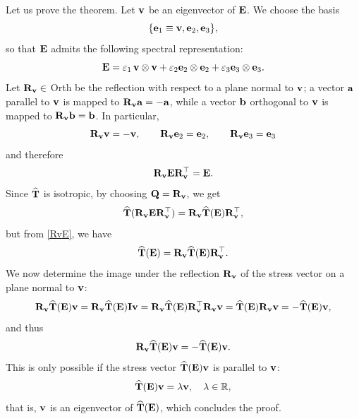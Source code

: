 Let us prove the theorem. Let $\vb$ be an eigenvector of $\Eb$. We choose the basis
\begin{equation}
	\{\eb_1\equiv \vb, \eb_2, \eb_3  \},
\end{equation}
so that $\Eb$ admits the following spectral representation:
\begin{equation}
	\Eb =\varepsilon_1\, \vb \otimes \vb +\varepsilon_2 \eb_2 \otimes \eb_2+ \varepsilon_3 \eb_3 \otimes \eb_3.
\end{equation}
Let $\Rb_\vb\in$ Orth be the reflection with respect to a plane normal to $\vb$; a vector $\ab$ parallel to $\vb$ is mapped to $\Rb_\vb\ab=-\ab$, while a vector $\bb$ orthogonal to $\vb$ is mapped to $\Rb_\vb\bb=\bb$. In particular,
\begin{equation}
	\Rb_\vb\vb =-\vb, \qquad \Rb_\vb\eb_2=\eb_2, \qquad \Rb_\vb\eb_3=\eb_3
\end{equation}
and therefore
\begin{equation}\label{RvE}
	\Rb_\vb\Eb \Rb_\vb^\top=\Eb.
\end{equation}
Since $\widehat{\Tb}$ is isotropic, by choosing $\Qb=\Rb_\vb$, we get
\begin{equation}
	\widehat{\Tb}(\Rb_\vb\Eb \Rb_\vb^\top)=\Rb_\vb\widehat{\Tb}(\Eb)\Rb_\vb^\top,
\end{equation}
but from \eqref{RvE}, we have
\begin{equation}
	\widehat{\Tb}(\Eb)=\Rb_\vb\widehat{\Tb}(\Eb)\Rb_\vb^\top.
\end{equation}
We now determine the image under the reflection $\Rb_\vb$ of the stress vector on a plane normal to $\vb$:
\begin{equation}
	\Rb_\vb\widehat{\Tb}(\Eb)\vb=	\Rb_\vb\widehat{\Tb}(\Eb)\Ib\vb=\Rb_\vb\widehat{\Tb}(\Eb)\Rb_\vb^\top\Rb_\vb \vb=\widehat{\Tb}(\Eb)\Rb_\vb \vb=-\widehat{\Tb}(\Eb)\vb,
\end{equation}
and thus
\begin{equation}
	\Rb_\vb\widehat{\Tb}(\Eb)\vb=-\widehat{\Tb}(\Eb)\vb.
\end{equation}
This is only possible if the stress vector $\widehat{\Tb}(\Eb)\vb$ is parallel to $\vb$:
\begin{equation}
	\widehat{\Tb}(\Eb)\vb=\lambda \vb, \quad \lambda\in \Ro,
\end{equation}
that is, $\vb$ is an eigenvector of $\widehat{\Tb}(\Eb)$, which concludes the proof.

\vspace{.3cm}

